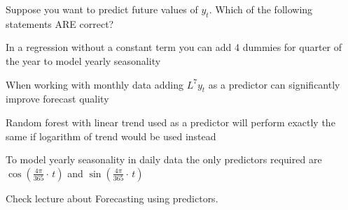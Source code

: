 
\begin{question}
Suppose you want to predict future values of \(y_t\). Which of the following statements ARE correct?
\begin{answerlist}
  \item In a regression without a constant term you can add 4 dummies for quarter of the year to model yearly seasonality
  \item When working with monthly data adding \(L^7y_t\) as a predictor can significantly improve forecast quality
  \item Random forest with linear trend used as a predictor will perform exactly the same if logarithm of trend would be used instead
  \item To model yearly seasonality in daily data the only predictors required are \(\operatorname{cos}\left({\frac{4\pi}{365}}\cdot\,t\right)\) and \(\operatorname{sin}\left({\frac{4\pi}{365}}\cdot\,t\right)\)
\end{answerlist}
\end{question}

\begin{solution}
Check lecture about Forecasting using predictors.
\end{solution}

